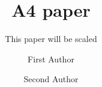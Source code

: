 \author
{
    First Author
    \and
    Second Author
}
\title{A4 paper}
\subtitle{This paper will be scaled}
\maketitle
\label{pap:A4}


